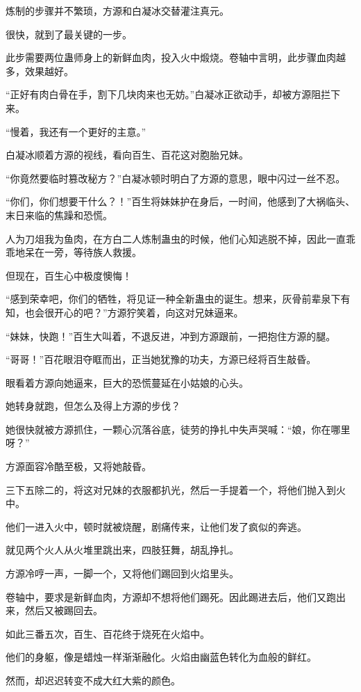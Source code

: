 \begin{this_body}
炼制的步骤并不繁琐，方源和白凝冰交替灌注真元。

很快，就到了最关键的一步。

此步需要两位蛊师身上的新鲜血肉，投入火中煅烧。卷轴中言明，此步骤血肉越多，效果越好。

“正好有肉白骨在手，割下几块肉来也无妨。”白凝冰正欲动手，却被方源阻拦下来。

“慢着，我还有一个更好的主意。”

白凝冰顺着方源的视线，看向百生、百花这对胞胎兄妹。

“你竟然要临时篡改秘方？”白凝冰顿时明白了方源的意思，眼中闪过一丝不忍。

“你们，你们想要干什么？！”百生将妹妹护在身后，一时间，他感到了大祸临头、末日来临的焦躁和恐慌。

人为刀俎我为鱼肉，在方白二人炼制蛊虫的时候，他们心知逃脱不掉，因此一直乖乖地呆在一旁，等待族人救援。

但现在，百生心中极度懊悔！

“感到荣幸吧，你们的牺牲，将见证一种全新蛊虫的诞生。想来，灰骨前辈泉下有知，也会很开心的吧？”方源狞笑着，向这对兄妹逼来。

“妹妹，快跑！”百生大叫着，不退反进，冲到方源跟前，一把抱住方源的腿。

“哥哥！”百花眼泪夺眶而出，正当她犹豫的功夫，方源已经将百生敲昏。

眼看着方源向她逼来，巨大的恐慌蔓延在小姑娘的心头。

她转身就跑，但怎么及得上方源的步伐？

她很快就被方源抓住，一颗心沉落谷底，徒劳的挣扎中失声哭喊：“娘，你在哪里呀？”

方源面容冷酷至极，又将她敲昏。

三下五除二的，将这对兄妹的衣服都扒光，然后一手提着一个，将他们抛入到火中。

他们一进入火中，顿时就被烧醒，剧痛传来，让他们发了疯似的奔逃。

就见两个火人从火堆里跳出来，四肢狂舞，胡乱挣扎。

方源冷哼一声，一脚一个，又将他们踢回到火焰里头。

卷轴中，要求是新鲜血肉，方源却不想将他们踢死。因此踢进去后，他们又跑出来，然后又被踢回去。

如此三番五次，百生、百花终于烧死在火焰中。

他们的身躯，像是蜡烛一样渐渐融化。火焰由幽蓝色转化为血般的鲜红。

然而，却迟迟转变不成大红大紫的颜色。


\end{this_body}
